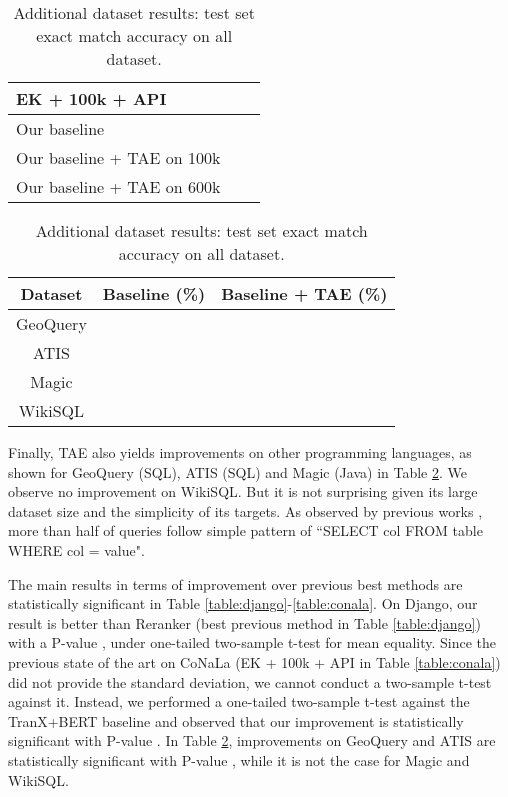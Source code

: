 \begin{table}[h]
\begin{tabular}{lll}
\small EK + 100k + API \scriptsize \cite{xu2020incorporating} &  \\
\hline
\small Our baseline &  \\
\small Our baseline + TAE on 100k &   \\
\small Our baseline + TAE on 600k &  {\boldmath } \\
\hline
\end{tabular}
\vspace{-0.5em}
\caption{\label{table:conala} CoNaLa test BLEU. Methods with  trained a separate model on top of SP to rerank beam search outputs. \citet{xu2020incorporating} used an additional bitext corpus mined from python API documentation.}
    \vspace{1em}
   \centering
       \small
    \begin{tabular}{ccc}
\hline \textbf{Dataset} & \textbf{Baseline (\%)} & \textbf{Baseline + TAE (\%)} \\ \hline
GeoQuery &  &  \\
ATIS &  &  \\
Magic  &  &   \\
WikiSQL  &   & \\
\hline
\end{tabular}
\vspace{-0.5em}
\caption{\label{table:extra_dataset_result} Additional dataset results: test set exact match accuracy on all dataset.}
\vspace{-0.5em}
\end{table}

Finally, TAE also yields improvements on other programming languages, as shown for GeoQuery (SQL), ATIS (SQL) and Magic (Java) in Table \ref{table:extra_dataset_result}. We observe no improvement on WikiSQL. But it is not surprising given its large dataset size and the simplicity of its targets. As observed by previous works \cite{finegan2018improving}, more than half of queries follow simple pattern of ``{\selectfont SELECT col FROM table WHERE col = value}".

The main results in terms of improvement over previous best methods are statistically significant in Table \ref{table:django}-\ref{table:conala}. On Django, our result is better than Reranker \cite{yin2019reranking} (best previous method in Table \ref{table:django}) with a P-value , under one-tailed two-sample t-test for mean equality. Since the previous state of the art on CoNaLa (EK + 100k + API in Table \ref{table:conala}) did not provide the standard deviation, we cannot conduct a two-sample t-test against it. Instead, we performed a one-tailed two-sample t-test against the TranX+BERT baseline and observed that our improvement is statistically significant with P-value . In Table \ref{table:extra_dataset_result}, improvements on GeoQuery and ATIS are statistically significant with P-value , while it is not the case for Magic and WikiSQL.


